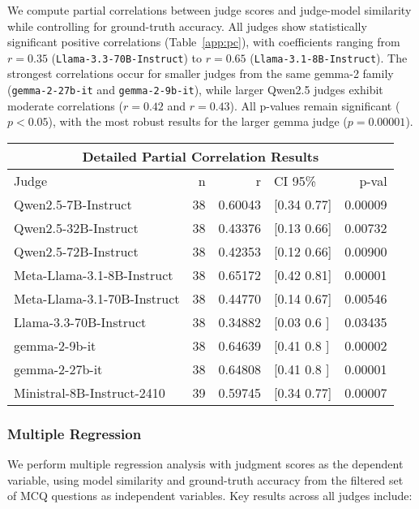 We compute partial correlations between judge scores and judge-model similarity while controlling for ground-truth accuracy. All judges show statistically significant positive correlations (Table~\ref{app:pc}), with coefficients ranging from $r=0.35$ (\texttt{Llama-3.3-70B-Instruct}) to $r=0.65$ (\texttt{Llama-3.1-8B-Instruct}). The strongest correlations occur for smaller judges from the same gemma-2 family (\texttt{gemma-2-27b-it} and \texttt{gemma-2-9b-it}), while larger Qwen2.5 judges exhibit moderate correlations ($r=0.42$ and $r=0.43$). All p-values remain significant ($p<0.05$), with the most robust results for the larger gemma judge ($p=0.00001$).

\begin{center}
\begin{tabular}{lrrlr}
\toprule
\multicolumn{5}{c}{\textbf{Detailed Partial Correlation Results}} \\
\midrule
Judge & n & r & CI 95\% & p-val \\
\midrule
Qwen2.5-7B-Instruct & 38 & 0.60043 & [0.34 0.77] & 0.00009 \\
Qwen2.5-32B-Instruct & 38 & 0.43376 & [0.13 0.66] & 0.00732 \\
Qwen2.5-72B-Instruct & 38 & 0.42353 & [0.12 0.66] & 0.00900 \\
Meta-Llama-3.1-8B-Instruct & 38 & 0.65172 & [0.42 0.81] & 0.00001 \\
Meta-Llama-3.1-70B-Instruct & 38 & 0.44770 & [0.14 0.67] & 0.00546 \\
Llama-3.3-70B-Instruct & 38 & 0.34882 & [0.03 0.6 ] & 0.03435 \\
gemma-2-9b-it & 38 & 0.64639 & [0.41 0.8 ] & 0.00002 \\
gemma-2-27b-it & 38 & 0.64808 & [0.41 0.8 ] & 0.00001 \\
Ministral-8B-Instruct-2410 & 39 & 0.59745 & [0.34 0.77] & 0.00007 \\
\bottomrule
\end{tabular}
\end{center}

\subsubsection{Multiple Regression}
\label{app:mr}

We perform multiple regression analysis with judgment scores as the dependent variable, using model similarity and ground-truth accuracy from the filtered set of MCQ questions as independent variables. Key results across all judges include:

